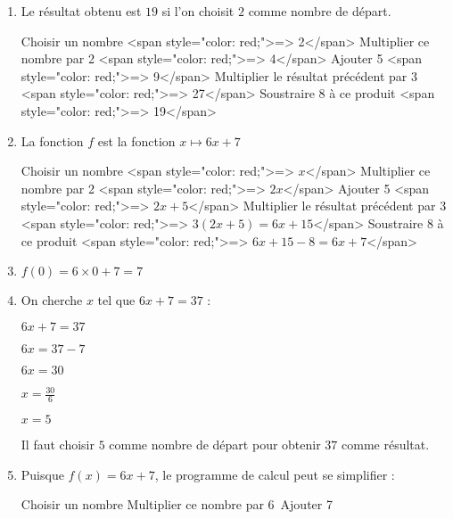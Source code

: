 \begin{corrige}
     \begin{enumerate}
          \item
          Le résultat obtenu est $19$ si l'on choisit $2$ comme nombre de départ.
          \begin{code}Choisir un nombre <span style="color: red;">=> 2</span>
               Multiplier ce nombre par 2 <span style="color: red;">=> 4</span>
               Ajouter 5 <span style="color: red;">=> 9</span>
               Multiplier le résultat précédent par 3 <span style="color: red;">=> 27</span>
               Soustraire 8 à ce produit <span style="color: red;">=> 19</span>
          \end{code}
          \item
          La fonction $f$ est la fonction $x \mapsto  6x+7$
          \begin{code}Choisir un nombre <span style="color: red;">=> $x$</span>
               Multiplier ce nombre par 2 <span style="color: red;">=> $2x$</span>
               Ajouter 5 <span style="color: red;">=> $2x+5$</span>
               Multiplier le résultat précédent par 3 <span style="color: red;">=> $3\left(2x+5\right)=6x+15$</span>
               Soustraire 8 à ce produit <span style="color: red;">=> $6x+15-8=6x+7$</span>
          \end{code}
          \item
          $f\left(0\right)=6\times 0+7=7$
          \item
          On cherche $x$ tel que $6x+7=37$ :
          \par
          $6x+7=37$
          \par
          $6x=37-7$
          \par
          $6x=30$
          \par
          $x=\frac{30}{6}$
          \par
          $x=5$
          \par
          Il faut choisir $5$ comme nombre de départ pour obtenir $37$ comme résultat.
          \item
          Puisque $f\left(x\right)=6x+7$, le programme de calcul peut se simplifier :
          \begin{code}
Choisir un nombre
Multiplier ce nombre par 6\
Ajouter 7
          \end{code}
     \end{enumerate}
\end{corrige}
